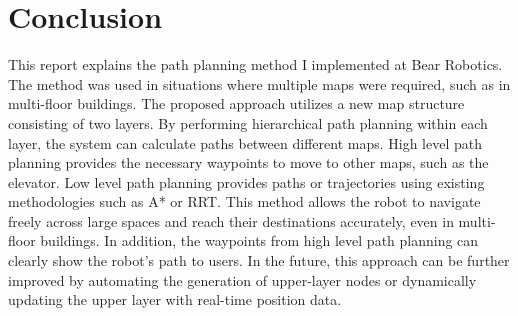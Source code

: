 \documentclass[en]{snu-cse-bsc-thesis}
\begin{document}
\chapter{Conclusion}\label{chap:conclusion}
This report explains the path planning method I implemented at Bear Robotics. 
The method was used in situations where multiple maps were required, such as in multi-floor buildings.
The proposed approach utilizes a new map structure consisting of two layers. 
By performing hierarchical path planning within each layer, the system can calculate paths between different maps.
High level path planning provides the necessary waypoints to move to other maps, such as the elevator. 
Low level path planning provides paths or trajectories using existing methodologies such as A* or RRT. 
This method allows the robot to navigate freely across large spaces and reach their destinations accurately, even in multi-floor buildings. 
In addition, the waypoints from high level path planning can clearly show the robot's path to users. 
In the future, this approach can be further improved by automating the generation of upper-layer nodes or dynamically updating the upper layer with real-time position data.

\printbibliography

\begin{abstract}[ko]
본 보고서에서는 여러 개의 지도를 활용하는 로봇을 위한 계층적 경로 계획 기법을 제안한다. 제안된 방법은 두 개의 layer로 구성된 하이브리드 맵 구조를 사용한다. 상위 layer는 그래프 구조로, 지도 간의 전환과 주요 경유지를 나타내며, 하위 layer는 점유 그리드 맵을 활용하여 정밀한 이동을 가능하게 한다.  

경로 계획은 세 단계로 이루어진다. 첫째, 로봇의 현재 위치를 상위 layer의 그래프에 새로운 노드로 추가한다. 둘째, 최단 경로 알고리즘을 사용하여 로봇이 거쳐야 할 waypoint를 계산한다. 셋째, 하위 layer에서 실시간 위치 및 장애물 정보를 고려하여 waypoint 간의 세부 이동 경로를 생성한다.  

이 방법은 수평 지도 전환 지점(Horizontal Map Change Point)과 엘리베이터 노드를 활용하여 넓은 공간 및 다층 건물에서도 원활한 이동을 가능하게 한다. 또한 확장성과 유연성을 보장하여 로봇이 광범위한 환경에서도 효과적으로 작동할 수 있도록 한다. 향후 연구에서는 상위 layer의 노드를 자동으로 생성하거나 실시간으로 업데이트하는 방식을 도입하여 적응성을 더욱 향상할 예정이다.

\end{abstract}
\end{document}
